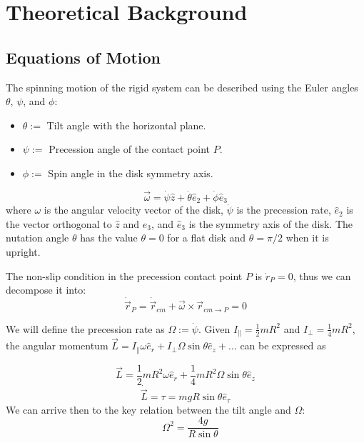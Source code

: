 \documentclass{article}
\begin{document}
\section{Theoretical Background}
\subsection{Equations of Motion}
The spinning motion of the rigid system can be described using the Euler angles $\theta$, $\psi$, and $\phi$:
\begin{itemize}
    \item $\theta:=$ Tilt angle with the horizontal plane.
    \item $\psi:=$ Precession angle of the contact point $P$.
    \item $\phi:=$ Spin angle in the disk symmetry axis.
\end{itemize}
\begin{equation}
    \vec\omega = \dot\psi\hat{z}+\dot\theta\hat{e}_{2}+\dot\phi\hat{e}_{3}
\end{equation}
where $\omega$ is the angular velocity vector of the disk, $\dot\psi$ is the precession rate, $\hat{e}_{2}$ is the vector orthogonal to $\hat{z}$ and $\hat{e}_{3}$, and $\hat{e}_{3}$ is the symmetry axis of the disk. The nutation angle $\theta$ has the value $\theta=0$ for a flat disk and $\theta=\pi/2$ when it is upright. 

The non-slip condition in the precession contact point $P$ is $\dot r_{P}=0$, thus we can decompose it into:
\begin{equation}
    \dot{\vec{r}}_{P}=\dot{\vec{r}}_{cm}+\vec{\omega}\times\vec{r}_{cm\rightarrow P}=0
\end{equation}

We will define the precession rate as $\Omega:=\dot\psi$.
Given $I_{\parallel}=\frac{1}{2}mR^2$ and $I_{\perp}=\frac{1}{4}mR^2$, the angular momentum $\vec L=I_{\parallel}\omega\hat e_r + I_{\perp}\Omega\sin\theta\hat e_z + ...$ can be expressed as

\begin{equation}
    \vec L=\frac{1}{2}mR^2\omega\hat e_r + \frac{1}{4}mR^2\Omega\sin\theta\hat e_z
\end{equation}
\begin{equation}
    \dot{\vec L}=\tau=mgR\sin\theta\hat e_{\tau}
\end{equation}
We can arrive then to the key relation between the tilt angle and $\Omega$:
\begin{equation}
    \quad \Omega^2=\frac{4g}{R\sin\theta}
\end{equation}
\end{document}
